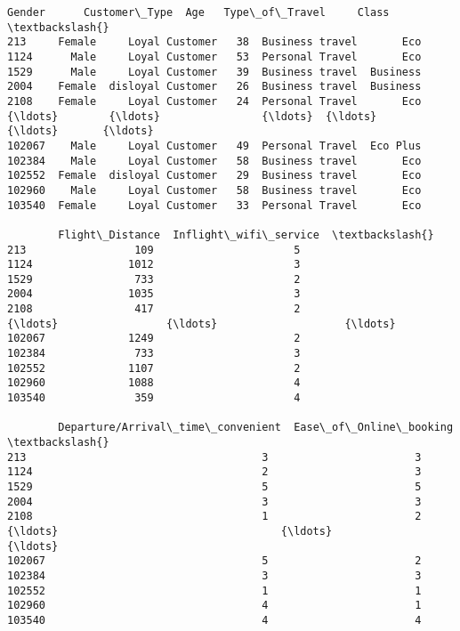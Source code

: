 \documentclass[11pt]{article}
\makeatletter
\newcommand{\boxspacing}{\kern\kvtcb@left@rule\kern\kvtcb@boxsep}
\newcommand{\prompt}[4]{
        {\ttfamily\llap{{\color{#2}[#3]:\hspace{3pt}#4}}\vspace{-\baselineskip}}
    }
\makeatother
\begin{document}
            \begin{tcolorbox}[breakable, size=fbox, boxrule=.5pt, pad at break*=1mm, opacityfill=0]
\prompt{Out}{outcolor}{11}{\boxspacing}
\begin{Verbatim}[commandchars=\\\{\}]
        Gender      Customer\_Type  Age   Type\_of\_Travel     Class  \textbackslash{}
213     Female     Loyal Customer   38  Business travel       Eco
1124      Male     Loyal Customer   53  Personal Travel       Eco
1529      Male     Loyal Customer   39  Business travel  Business
2004    Female  disloyal Customer   26  Business travel  Business
2108    Female     Loyal Customer   24  Personal Travel       Eco
{\ldots}        {\ldots}                {\ldots}  {\ldots}              {\ldots}       {\ldots}
102067    Male     Loyal Customer   49  Personal Travel  Eco Plus
102384    Male     Loyal Customer   58  Business travel       Eco
102552  Female  disloyal Customer   29  Business travel       Eco
102960    Male     Loyal Customer   58  Business travel       Eco
103540  Female     Loyal Customer   33  Personal Travel       Eco

        Flight\_Distance  Inflight\_wifi\_service  \textbackslash{}
213                 109                      5
1124               1012                      3
1529                733                      2
2004               1035                      3
2108                417                      2
{\ldots}                 {\ldots}                    {\ldots}
102067             1249                      2
102384              733                      3
102552             1107                      2
102960             1088                      4
103540              359                      4

        Departure/Arrival\_time\_convenient  Ease\_of\_Online\_booking  \textbackslash{}
213                                     3                       3
1124                                    2                       3
1529                                    5                       5
2004                                    3                       3
2108                                    1                       2
{\ldots}                                   {\ldots}                     {\ldots}
102067                                  5                       2
102384                                  3                       3
102552                                  1                       1
102960                                  4                       1
103540                                  4                       4


\end{Verbatim}
\end{tcolorbox}
\end{document}
